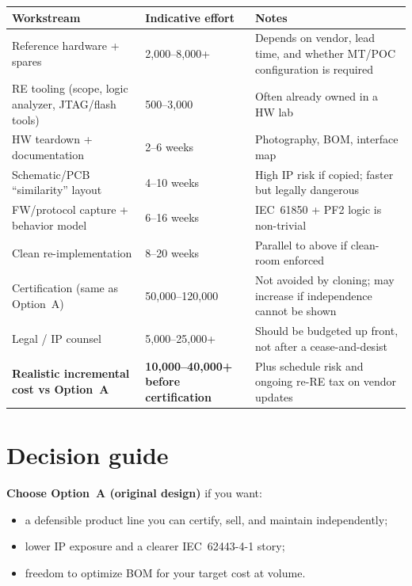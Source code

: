 \documentclass[11pt,a4paper]{article}
\begin{document}
\begin{tabularx}{\linewidth}{@{}lX>{\raggedright\arraybackslash}X@{}}
\toprule
\textbf{Workstream} & \textbf{Indicative effort} & \textbf{Notes} \\
\midrule
Reference hardware + spares & \EUR{}2{,}000--8{,}000+ & Depends on vendor, lead time, and whether MT/POC configuration is required \\
RE tooling (scope, logic analyzer, JTAG/flash tools) & \EUR{}500--3{,}000 & Often already owned in a HW lab \\
HW teardown + documentation & 2--6 weeks & Photography, BOM, interface map \\
Schematic/PCB ``similarity'' layout & 4--10 weeks & High IP risk if copied; faster but legally dangerous \\
FW/protocol capture + behavior model & 6--16 weeks & IEC~61850 + PF2 logic is non-trivial \\
Clean re-implementation & 8--20 weeks & Parallel to above if clean-room enforced \\
Certification (same as Option~A) & \EUR{}50{,}000--120{,}000 & Not avoided by cloning; may increase if independence cannot be shown \\
Legal / IP counsel & \EUR{}5{,}000--25{,}000+ & Should be budgeted up front, not after a cease-and-desist \\
\midrule
\textbf{Realistic incremental cost vs Option~A} &
\textbf{\EUR{}10{,}000--40{,}000+ before certification} &
Plus schedule risk and ongoing re-RE tax on vendor updates \\
\bottomrule
\end{tabularx}

\section{Decision guide}

\textbf{Choose Option~A (original design)} if you want:
\begin{itemize}[noitemsep]
  \item a defensible product line you can certify, sell, and maintain independently;
  \item lower IP exposure and a clearer IEC~62443-4-1 story;
  \item freedom to optimize BOM for your target cost at volume.
\end{itemize}
\end{document}
